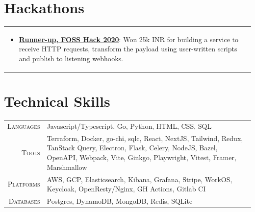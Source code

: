 \documentclass[a4paper,10pt]{extarticle} %
\begin{document}
\section{\textcolor{primary}{Hackathons}}
\begin{tabularx}{\linewidth}{X}
\begin{itemize}[leftmargin=*, nosep, before=\vspace{-0.8\baselineskip}, after=\vspace{-1.0\baselineskip}]
    \item \textbf{\href{https://forum.fossunited.org/t/foss-hack-2020-results}{Runner-up, FOSS Hack 2020}}: Won 25k INR for building a service to receive HTTP requests, transform the payload using user-written scripts and publish to listening webhooks.
\end{itemize}
\end{tabularx}


\section{\textcolor{primary}{Technical Skills}}
\begin{tabularx}{\linewidth}{r|X}
\textsc{Languages} & Javascript/Typescript, Go, Python, HTML, CSS, SQL\\
\textsc{Tools} & Terraform, Docker, go-chi, sqlc, React, NextJS, Tailwind, Redux, TanStack Query, Electron, Flask, Celery, NodeJS, Bazel, OpenAPI, Webpack, Vite, Ginkgo, Playwright, Vitest, Framer, Marshmallow\\
\textsc{Platforms} & AWS, GCP, Elasticsearch, Kibana, Grafana, Stripe, WorkOS, Keycloak, OpenResty/Nginx, GH Actions, Gitlab CI\\
\textsc{Databases} & Postgres, DynamoDB, MongoDB, Redis, SQLite
\end{tabularx}
\end{document}

